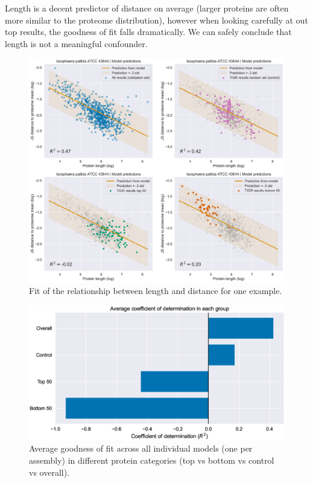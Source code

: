 \documentclass[12pt]{article}
\begin{document}
Length is a decent predictor of distance on average (larger proteins are often more similar to the proteome distribution), however when looking carefully at out top results, the goodness of fit falls dramatically.
\newline
\newline
We can safely conclude that length is not a meaningful confounder.

\begin{figure}[!htb]
\hspace*{-2cm}
\includegraphics[scale = .5]{length_fit_example.pdf}
\caption{Fit of the relationship between length and distance for one example.}
\label{fig:length_fit_example}
\end{figure}

\begin{figure}[!htb]
\hspace*{-1.8cm}
\includegraphics[scale = .65]{r_squared_comparison.eps}
\caption{Average goodness of fit across all individual models (one per assembly) in different protein categories (top vs bottom vs control vs overall).}
\label{fig:r_squared_comparison}
\end{figure}
\end{document}
